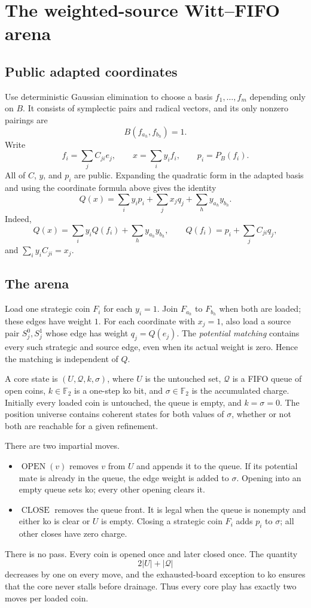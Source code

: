 \documentclass[11pt]{article}
\theoremstyle{definition}
\theoremstyle{remark}
\newcommand{\F}{\mathbb{F}}
\begin{document}
\section{The weighted-source Witt--FIFO arena}\label{sec:wittfifo}

\subsection{Public adapted coordinates}

Use deterministic Gaussian elimination to choose a basis
$f_1,\dots,f_m$ depending only on $B$.  It consists of symplectic pairs and
radical vectors, and its only nonzero pairings are
\[
 B(f_{a_h},f_{b_h})=1.
\]
Write
\[
 f_i=\sum_j C_{ji}e_j,\qquad x=\sum_i y_if_i,\qquad p_i=P_B(f_i).
\]
All of $C$, $y$, and $p_i$ are public.  Expanding the quadratic form in the
adapted basis and using the coordinate formula above gives the identity
\[
 Q(x)=
 \sum_i y_ip_i
 +\sum_jx_jq_j
 +\sum_h y_{a_h}y_{b_h}.
\]
Indeed,
\[
 Q(x)=\sum_i y_iQ(f_i)+\sum_hy_{a_h}y_{b_h},
 \qquad
 Q(f_i)=p_i+\sum_jC_{ji}q_j,
\]
and $\sum_i y_iC_{ji}=x_j$.

\subsection{The arena}

Load one strategic coin $F_i$ for each $y_i=1$.  Join $F_{a_h}$ to
$F_{b_h}$ when both are loaded; these edges have weight $1$.  For each
coordinate with $x_j=1$, also load a source pair $S_j^0,S_j^1$ whose edge has
weight $q_j=Q(e_j)$.  The \emph{potential matching} contains every such
strategic and source edge, even when its actual weight is zero.  Hence the
matching is independent of $Q$.

A core state is $(U,\mathcal Q,k,\sigma)$, where $U$ is the untouched set,
$\mathcal Q$ is a FIFO queue of open coins, $k\in\F_2$ is a one-step ko bit,
and $\sigma\in\F_2$ is the accumulated charge.  Initially every loaded coin
is untouched, the queue is empty, and $k=\sigma=0$.  The position universe
contains coherent states for both values of $\sigma$, whether or not both are
reachable for a given refinement.

There are two impartial moves.
\begin{itemize}
\item $\operatorname{OPEN}(v)$ removes $v$ from $U$ and appends it to the
      queue.  If its potential mate is already in the queue, the edge weight
      is added to $\sigma$.  Opening into an empty queue sets ko; every other opening
      clears it.
\item $\operatorname{CLOSE}$ removes the queue front.  It is legal when the
      queue is nonempty and either ko is clear or $U$ is empty.  Closing a
      strategic coin $F_i$ adds $p_i$ to $\sigma$; all other closes have zero
      charge.
\end{itemize}
There is no pass.  Every coin is opened once and later closed once.  The
quantity
\[
  2|U|+|\mathcal Q|
\]
decreases by one on every move, and the exhausted-board exception to ko
ensures that the core never stalls before drainage.  Thus every core play has
exactly two moves per loaded coin.
\end{document}
